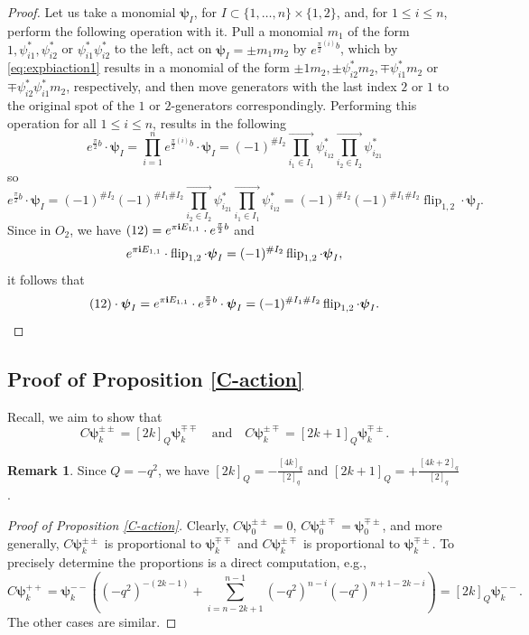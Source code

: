 \documentclass[10pt]{amsart}
\numberwithin{equation}{section}
\theoremstyle{definition}
\newtheorem{remark}[theorem]{Remark}
\newcommand{\flip}{\operatorname{flip}}
\newcommand{\hwp}{\boldsymbol{\psi}}
\begin{document}
\begin{proof}
    Let us take a monomial $\hwp_I$, for $I\subset \{1, \dots, n\}\times \{1, 2\}$, and, for $1\le i\le n$, perform the following operation with it. Pull a monomial $m_1$ of the form $1,\psi^*_{i1},\psi^*_{i2}$ or $\psi^*_{i1}\psi^*_{i2}$ to the left, act on $\hwp_I=\pm m_1m_2$ by $e^{\frac{\pi}{2}{}^{(i)}b}$, which by \eqref{eq:expbiaction1} results in a monomial of the form $\pm1m_2,\pm \psi^*_{i2}m_2,\mp\psi^*_{i1}m_2$ or $\mp\psi^*_{i2}\psi^*_{i1}m_2$, respectively, and then move generators with the last index $2$ or $1$ to the original spot of the $1$ or $2$-generators correspondingly. Performing this operation for all $1\le i\le n$, results in the following
\[
e^{\frac{\pi}{2}b}\cdot \hwp_I=\prod_{i=1}^n e^{\frac{\pi}{2}{}^{(i)}b}\cdot \hwp_I = (-1)^{\#I_2}\prod^{\rightarrow}_{i_1\in I_1}\psi_{i_12}^* \prod^{\rightarrow}_{i_2\in I_2}\psi_{i_21}^*
\]
so
\[
e^{\frac{\pi}{2}b}\cdot \hwp_I= (-1)^{\#I_2}(-1)^{\#I_1\#I_2}\prod^{\rightarrow}_{i_2\in I_2}\psi_{i_21}^*\prod^{\rightarrow}_{i_1\in I_1}\psi_{i_12}^* = (-1)^{\#I_2}(-1)^{\#I_1\#I_2}\flip_{1,2}\cdot \hwp_I.
\]
Since in $O_2$, we have $(12)= e^{\pi {\bf i} E_{1,1}}\cdot e^{\frac{\pi}{2}b}$ and 
\[
e^{\pi {\bf i} E_{1,1}}\cdot \flip_{1,2}\cdot \hwp_I = (-1)^{\#I_2}\flip_{1,2}\cdot\hwp_I,
\]
it follows that
\[
(12)\cdot \hwp_I=e^{\pi {\bf i} E_{1,1}}\cdot e^{\frac{\pi}{2}b}\cdot \hwp_I= (-1)^{\#I_1\#I_2}\flip_{1,2} \cdot\hwp_I.
\]
\end{proof}

\subsection{Proof of Proposition \ref{C-action}}\label{proof5.12}

Recall, we aim to show that 
    \[
        C\hwp^{\pm \pm}_k= [2k]_Q \hwp_k^{\mp\mp} \quad \text{and} \quad C\hwp^{\pm \mp}_k= [2k+1]_Q \hwp_k^{\mp\pm}.
    \]

\begin{remark}
Since $Q=-q^2$, we have $[2k]_Q= -\frac{[4k]_q}{[2]_q}$ and $[2k+1]_Q= +\frac{[4k+2]_q}{[2]_q}$.    
\end{remark}


\begin{proof}[Proof of Proposition \ref{C-action}]
Clearly, $C\hwp_0^{\pm \pm}=0$, $C\hwp_0^{\pm\mp}=\hwp_0^{\mp\pm}$, and more generally,
$C\hwp_{k}^{\pm \pm}$ is proportional to $\hwp_{k}^{\mp \mp}$ and $C\hwp_{k}^{\pm \mp}$ is proportional to $\hwp_{k}^{\mp \pm}$. To precisely determine the proportions is a direct computation, e.g.,
\[
    C\hwp^{++}_k = \hwp^{--}_k ((-q^2)^{-(2k-1)}+\sum_{i=n-2k+1}^{n-1}(-q^2)^{n-i}(-q^2)^{n+1-2k-i})=[2k]_Q\hwp^{--}_k.
\]
The other cases are similar.
\end{proof}
\end{document}
